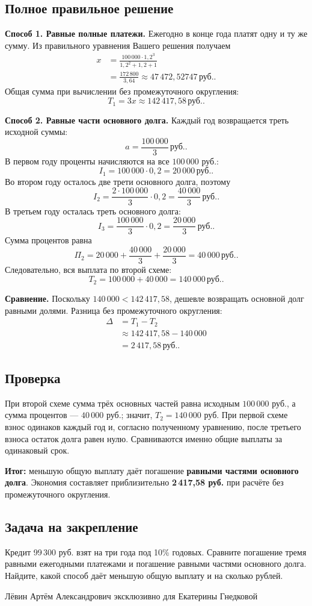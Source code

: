 \documentclass[12pt,a4paper]{article}
\newcommand{\rub}{\,\text{руб.}}
\newcommand{\Result}{\textcolor{teal!60!black}{\textbf{Итог:}}}
\begin{document}
\subsection*{Полное правильное решение}
\textbf{Способ 1. Равные полные платежи.} Ежегодно в конце года платят одну и ту же сумму. Из правильного уравнения Вашего решения получаем
\[
\begin{aligned}
x&=\frac{100\,000\cdot1{,}2^3}{1{,}2^2+1{,}2+1}\\
&=\frac{172\,800}{3{,}64}
\approx47\,472{,}52747\rub.
\end{aligned}
\]
Общая сумма при вычислении без промежуточного округления:
\[
T_1=3x\approx142\,417{,}58\rub.
\]

\textbf{Способ 2. Равные части основного долга.} Каждый год возвращается треть исходной суммы:
\[
a=\frac{100\,000}{3}\rub.
\]
В первом году проценты начисляются на все $100\,000$ руб.:
\[
I_1=100\,000\cdot0{,}2=20\,000\rub.
\]
Во втором году осталось две трети основного долга, поэтому
\[
I_2=\frac{2\cdot100\,000}{3}\cdot0{,}2
=\frac{40\,000}{3}\rub.
\]
В третьем году осталась треть основного долга:
\[
I_3=\frac{100\,000}{3}\cdot0{,}2
=\frac{20\,000}{3}\rub.
\]
Сумма процентов равна
\[
\Pi_2=20\,000+\frac{40\,000}{3}+\frac{20\,000}{3}
=40\,000\rub.
\]
Следовательно, вся выплата по второй схеме:
\[
T_2=100\,000+40\,000=140\,000\rub.
\]

\textbf{Сравнение.} Поскольку $140\,000<142\,417{,}58$, дешевле возвращать основной долг равными долями. Разница без промежуточного округления:
\[
\begin{aligned}
\Delta&=T_1-T_2\\
&\approx142\,417{,}58-140\,000\\
&=2\,417{,}58\rub.
\end{aligned}
\]

\subsection*{Проверка}
При второй схеме сумма трёх основных частей равна исходным $100\,000$ руб., а сумма процентов --- $40\,000$ руб.; значит, $T_2=140\,000$ руб. При первой схеме взнос одинаков каждый год и, согласно полученному уравнению, после третьего взноса остаток долга равен нулю. Сравниваются именно общие выплаты за одинаковый срок.

\Result{} меньшую общую выплату даёт погашение \textbf{равными частями основного долга}. Экономия составляет приблизительно \textbf{2\,417,58 руб.} при расчёте без промежуточного округления.

\subsection*{Задача на закрепление}
Кредит 99\,300 руб. взят на три года под 10\% годовых. Сравните погашение тремя равными ежегодными платежами и погашение равными частями основного долга. Найдите, какой способ даёт меньшую общую выплату и на сколько рублей.

\vfill
\begin{center}
\small Лёвин Артём Александрович эксклюзивно для Екатерины Гнедковой
\end{center}
\end{document}

